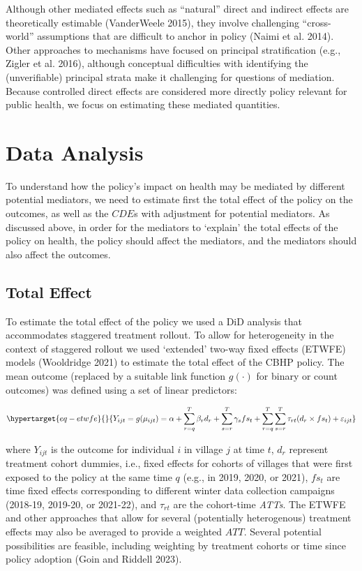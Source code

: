 \documentclass[
  letterpaper,
  DIV=11,
  numbers=noendperiod]{scrartcl}
\begin{document}
Although other mediated effects such as ``natural'' direct and indirect
effects are theoretically estimable (VanderWeele 2015), they involve
challenging ``cross-world'' assumptions that are difficult to anchor in
policy (Naimi et al. 2014). Other approaches to mechanisms have focused
on principal stratification (e.g., Zigler et al. 2016), although
conceptual difficulties with identifying the (unverifiable) principal
strata make it challenging for questions of mediation. Because
controlled direct effects are considered more directly policy relevant
for public health, we focus on estimating these mediated quantities.

\hypertarget{data-analysis}{%
\section{Data Analysis}\label{data-analysis}}

To understand how the policy's impact on health may be mediated by
different potential mediators, we need to estimate first the total
effect of the policy on the outcomes, as well as the \(CDE\)s with
adjustment for potential mediators. As discussed above, in order for the
mediators to `explain' the total effects of the policy on health, the
policy should affect the mediators, and the mediators should also affect
the outcomes.

\hypertarget{total-effect}{%
\subsection{Total Effect}\label{total-effect}}

To estimate the total effect of the policy we used a DiD analysis that
accommodates staggered treatment rollout. To allow for heterogeneity in
the context of staggered rollout we used `extended' two-way fixed
effects (ETWFE) models (Wooldridge 2021) to estimate the total effect of
the CBHP policy. The mean outcome (replaced by a suitable link function
\(g(\cdot)\) for binary or count outcomes) was defined using a set of
linear predictors:

\begin{equation}\protect\hypertarget{eq-etwfe}{}{Y_{ijt}=g(\mu_{ijt}) = \alpha + \sum_{r=q}^{T} \beta_{r} d_{r} + \sum_{s=r}^{T} \gamma_{s} fs_{t}+ \sum_{r=q}^{T} \sum_{s=r}^{T} \tau_{rt} (d_{r} \times fs_{t}) + \varepsilon_{ijt}}\label{eq-etwfe}\end{equation}

where \(Y_{ijt}\) is the outcome for individual \(i\) in village \(j\)
at time \(t\), \(d_{r}\) represent treatment cohort dummies, i.e., fixed
effects for cohorts of villages that were first exposed to the policy at
the same time \(q\) (e.g., in 2019, 2020, or 2021), \(fs_{t}\) are time
fixed effects corresponding to different winter data collection
campaigns (2018-19, 2019-20, or 2021-22), and \(\tau_{rt}\) are the
cohort-time \emph{ATTs}. The ETWFE and other approaches that allow for
several (potentially heterogenous) treatment effects may also be
averaged to provide a weighted \(ATT\). Several potential possibilities
are feasible, including weighting by treatment cohorts or time since
policy adoption (Goin and Riddell 2023).
\end{document}
